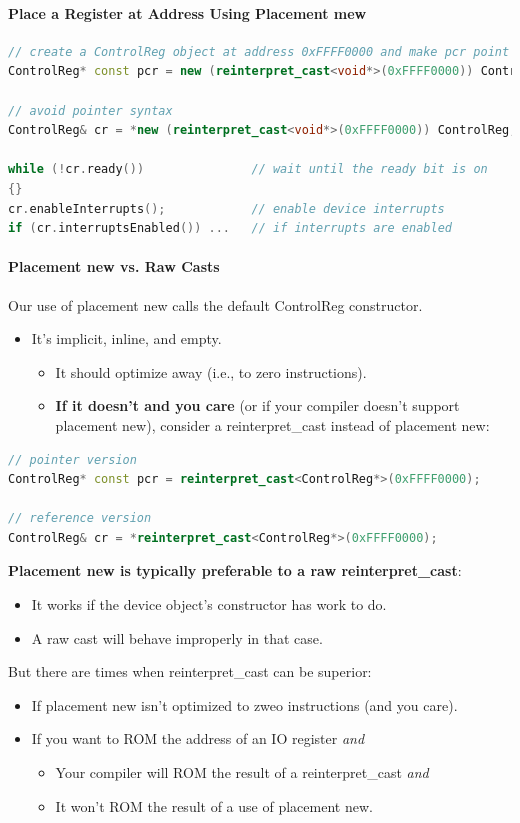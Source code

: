 \paragraph{Place a Register at Address Using Placement mew}
\begin{lstlisting}[language=C++]
// create a ControlReg object at address 0xFFFF0000 and make pcr point to it
ControlReg* const pcr = new (reinterpret_cast<void*>(0xFFFF0000)) ControlReg;

// avoid pointer syntax
ControlReg& cr = *new (reinterpret_cast<void*>(0xFFFF0000)) ControlReg;

while (!cr.ready())               // wait until the ready bit is on
{}
cr.enableInterrupts();            // enable device interrupts
if (cr.interruptsEnabled()) ...   // if interrupts are enabled
\end{lstlisting}

\paragraph{Placement new vs. Raw Casts}
Our use of placement new calls the default ControlReg constructor.
\begin{itemize}
  \item It's implicit, inline, and empty.
  \begin{itemize}
    \item It should optimize away (i.e., to zero instructions).
    \item \textbf{If it doesn't and you care} (or if your compiler doesn't support placement new), consider a reinterpret\_cast instead of placement new:
  \end{itemize}
\end{itemize}
\begin{lstlisting}[language=C++]
// pointer version
ControlReg* const pcr = reinterpret_cast<ControlReg*>(0xFFFF0000);

// reference version
ControlReg& cr = *reinterpret_cast<ControlReg*>(0xFFFF0000);
\end{lstlisting}
\textbf{Placement new is typically preferable to a raw reinterpret\_cast}:
\begin{itemize}
  \item It works if the device object's constructor has work to do.
  \item A raw cast will behave improperly in that case.
\end{itemize}
But there are times when reinterpret\_cast can be superior:
\begin{itemize}
  \item If placement new isn't optimized to zweo instructions (and you care).
  \item If you want to ROM the address of an IO register \textit{and}
  \begin{itemize}
    \item Your compiler will ROM the result of a reinterpret\_cast \textit{and}
    \item It won't ROM the result of a use of placement new.
  \end{itemize}
\end{itemize}


